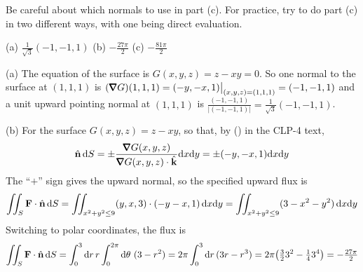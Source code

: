 \begin{hint} 
Be careful about which normals to use in part (c). For practice, try to do 
part (c) in two different ways, with one being direct evaluation.
\end{hint}

\begin{answer} 
(a) $\frac{1}{\sqrt{3}}(-1,-1,1)$\qquad
(b) $-\tfrac{27\pi}{2}$\qquad
(c) $-\tfrac{81\pi}{2}$
\end{answer}

\begin{solution}  (a)
The equation of the surface is $G(x,y,z)=z-xy=0$. So one normal to the
surface at $(1,1,1)$ is $(\vnabla G)(1,1,1)=(-y,-x,1)\big|_{(x,y,z)=(1,1,1)}
=(-1,-1,1)$ and a unit upward pointing normal at $(1,1,1)$ is
$\frac{(-1,-1,1)}{|(-1,-1,1)|}=\frac{1}{\sqrt{3}}(-1,-1,1)$.


\noindent (b)
For the surface $G(x,y,z)=z-xy$, so that, by ()
in the CLP-4 text,
\begin{align*}
\hn\,\dee{S} =\pm\frac{\vnabla G(x,y,z)}{\vnabla G(x,y,z)\cdot\hk}\dee{x}\dee{y}
=\pm (-y,-x,1) \dee{x}\dee{y}
\end{align*}
The ``$+$'' sign gives the upward normal, so the specified upward flux is
\begin{align*}
\iint_S \mathbf{F}\cdot\hat{\mathbf{n}}\,\mathrm{d}S
=\iint_{x^2+y^2\le 9} (y,x,3)\cdot (-y-x,1)\,\mathrm{d}x\mathrm{d}y
=\iint_{x^2+y^2\le 9} (3-x^2-y^2)\,\mathrm{d}x\mathrm{d}y
\end{align*}
Switching to polar coordinates, the flux is
\begin{align*}
\iint_S \mathbf{F}\cdot\hat{\mathbf{n}}\,\mathrm{d}S
=\int_0^3\mathrm{d}r\,r\int_0^{2\pi}\mathrm{d}\theta\ (3-r^2)
=2\pi \int_0^3 \mathrm{d}r\, (3r-r^3)
=2\pi \big(\tfrac{3}{2}3^2-\tfrac{1}{4}3^4\big)
=-\tfrac{27\pi}{2}
\end{align*}


\end{solution}
